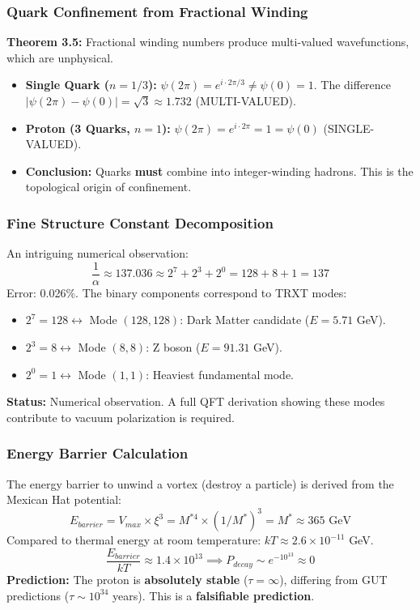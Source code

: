 \subsubsection{Quark Confinement from Fractional Winding}
\textbf{Theorem 3.5:} Fractional winding numbers produce multi-valued wavefunctions, which are unphysical.
\begin{itemize}
    \item \textbf{Single Quark ($n = 1/3$):} $\psi(2\pi) = e^{i \cdot 2\pi/3} \neq \psi(0) = 1$. The difference $|\psi(2\pi) - \psi(0)| = \sqrt{3} \approx 1.732$ (MULTI-VALUED).
    \item \textbf{Proton (3 Quarks, $n = 1$):} $\psi(2\pi) = e^{i \cdot 2\pi} = 1 = \psi(0)$ (SINGLE-VALUED).
    \item \textbf{Conclusion:} Quarks \textbf{must} combine into integer-winding hadrons. This is the topological origin of confinement.
\end{itemize}

\subsubsection{Fine Structure Constant Decomposition}
An intriguing numerical observation:
\begin{equation}
    \frac{1}{\alpha} \approx 137.036 \approx 2^7 + 2^3 + 2^0 = 128 + 8 + 1 = 137
\end{equation}
Error: 0.026\%. The binary components correspond to TRXT modes:
\begin{itemize}
    \item $2^7 = 128 \leftrightarrow$ Mode $(128, 128)$: Dark Matter candidate ($E = 5.71$ GeV).
    \item $2^3 = 8 \leftrightarrow$ Mode $(8, 8)$: Z boson ($E = 91.31$ GeV).
    \item $2^0 = 1 \leftrightarrow$ Mode $(1, 1)$: Heaviest fundamental mode.
\end{itemize}
\textbf{Status:} Numerical observation. A full QFT derivation showing these modes contribute to vacuum polarization is required.

\subsubsection{Energy Barrier Calculation}
The energy barrier to unwind a vortex (destroy a particle) is derived from the Mexican Hat potential:
\begin{equation}
    E_{barrier} = V_{max} \times \xi^3 = M^{*4} \times (1/M^*)^3 = M^* \approx 365 \text{ GeV}
\end{equation}
Compared to thermal energy at room temperature: $kT \approx 2.6 \times 10^{-11}$ GeV.
\begin{equation}
    \frac{E_{barrier}}{kT} \approx 1.4 \times 10^{13} \implies P_{decay} \sim e^{-10^{13}} \approx 0
\end{equation}
\textbf{Prediction:} The proton is \textbf{absolutely stable} ($\tau = \infty$), differing from GUT predictions ($\tau \sim 10^{34}$ years). This is a \textbf{falsifiable prediction}.

